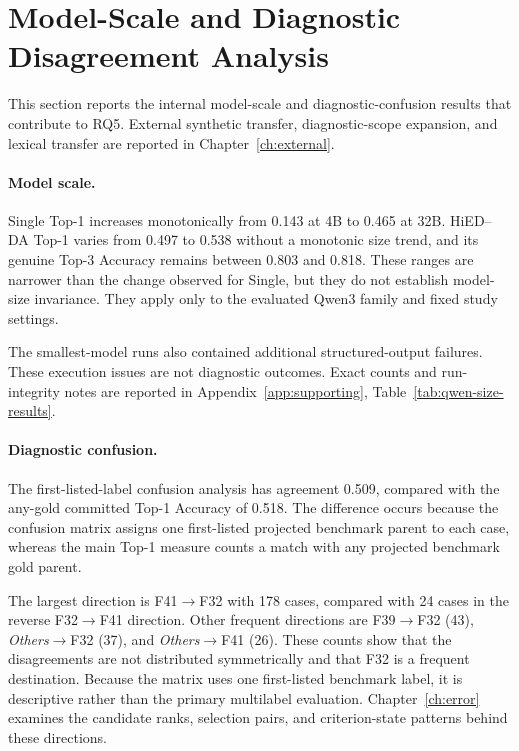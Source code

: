 \section{Model-Scale and Diagnostic Disagreement Analysis}
\label{sec:model-scale-disagreement}

This section reports the internal model-scale and diagnostic-confusion results that contribute to RQ5. External synthetic transfer, diagnostic-scope expansion, and lexical transfer are reported in Chapter~\ref{ch:external}.

\paragraph{Model scale.}

Single Top-1 increases monotonically from 0.143 at 4B to 0.465 at 32B. HiED--DA Top-1 varies from 0.497 to 0.538 without a monotonic size trend, and its genuine Top-3 Accuracy remains between 0.803 and 0.818. These ranges are narrower than the change observed for Single, but they do not establish model-size invariance. They apply only to the evaluated Qwen3 family and fixed study settings.

The smallest-model runs also contained additional structured-output failures. These execution issues are not diagnostic outcomes. Exact counts and run-integrity notes are reported in Appendix~\ref{app:supporting}, Table~\ref{tab:qwen-size-results}.

\paragraph{Diagnostic confusion.}
The first-listed-label confusion analysis has agreement 0.509, compared with the any-gold committed Top-1 Accuracy of 0.518. The difference occurs because the confusion matrix assigns one first-listed projected benchmark parent to each case, whereas the main Top-1 measure counts a match with any projected benchmark gold parent.


The largest direction is F41$\rightarrow$F32 with 178 cases, compared with 24 cases in the reverse F32$\rightarrow$F41 direction. Other frequent directions are F39$\rightarrow$F32 (43), \emph{Others}$\rightarrow$F32 (37), and \emph{Others}$\rightarrow$F41 (26). These counts show that the disagreements are not distributed symmetrically and that F32 is a frequent destination. Because the matrix uses one first-listed benchmark label, it is descriptive rather than the primary multilabel evaluation. Chapter~\ref{ch:error} examines the candidate ranks, selection pairs, and criterion-state patterns behind these directions.

